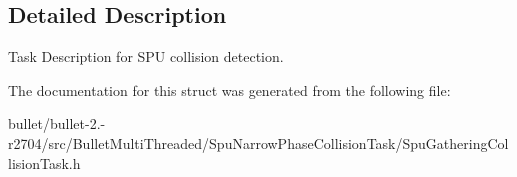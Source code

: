 \subsection{Detailed Description}
Task Description for S\+P\+U collision detection. 

The documentation for this struct was generated from the following file\+:\begin{DoxyCompactItemize}
\item 
bullet/bullet-\/2.-\/r2704/src/\+Bullet\+Multi\+Threaded/\+Spu\+Narrow\+Phase\+Collision\+Task/Spu\+Gathering\+Collision\+Task.\+h\end{DoxyCompactItemize}

